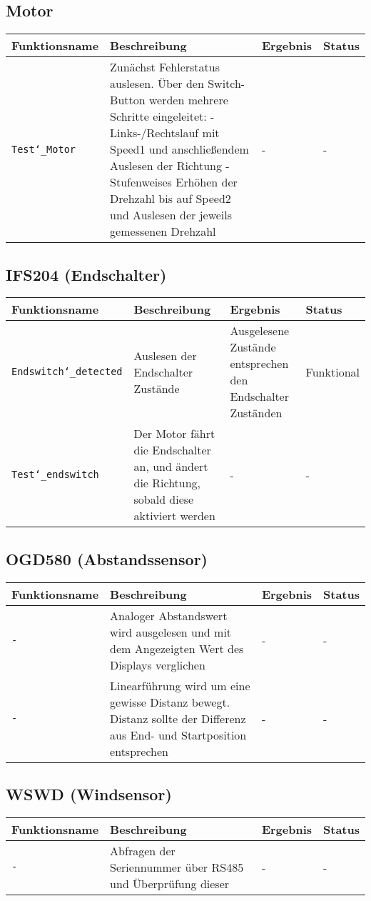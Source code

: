\documentclass{article}
\begin{document}
	\subsection{Motor}
		\begin{tabular}{|p{3.2cm}|p{5.5cm}|p{4cm}| p{1.6cm} |}
			\hline
				\textbf{Funktionsname} & \textbf{Beschreibung} & \textbf{Ergebnis} & \textbf{Status} \\
			\hline
				\texttt{Test\char`_Motor} & Zunächst Fehlerstatus auslesen. Über den Switch-Button werden mehrere Schritte eingeleitet: - Links-/Rechtslauf mit Speed1 und anschließendem Auslesen der Richtung - Stufenweises Erhöhen der Drehzahl bis auf Speed2 und Auslesen der jeweils gemessenen Drehzahl & - & - \\
			\hline
		\end{tabular}
	\subsection{IFS204 (Endschalter)}
		\begin{tabular}{|p{3.2cm}|p{5.5cm}|p{4cm}| p{1.6cm} |}
			\hline
				\textbf{Funktionsname} & \textbf{Beschreibung} & \textbf{Ergebnis} & \textbf{Status} \\
			\hline
				 \texttt{Endswitch\char`_detected} & Auslesen der Endschalter Zustände & Ausgelesene Zustände entsprechen den Endschalter Zuständen & Funktional \\
			\hline
				\texttt{Test\char`_endswitch} & Der Motor fährt die Endschalter an, und ändert die Richtung, sobald diese aktiviert werden & - & - \\
			 \hline
		\end{tabular}
	\subsection{OGD580 (Abstandssensor)}
		\begin{tabular}{|p{3.2cm}|p{5.5cm}|p{4cm}| p{1.6cm} |}
			\hline
				\textbf{Funktionsname} & \textbf{Beschreibung} & \textbf{Ergebnis} & \textbf{Status} \\
			\hline
				\texttt{-} & Analoger Abstandswert wird ausgelesen und mit dem Angezeigten Wert des Displays verglichen & - & - \\
			\hline
				\texttt{-} & Linearführung wird um eine gewisse Distanz bewegt. Distanz sollte der Differenz aus End- und Startposition entsprechen & - & - \\
			\hline
		\end{tabular}
	\subsection{WSWD (Windsensor)}
		\begin{tabular}{|p{3.2cm}|p{5.5cm}|p{4cm}| p{1.6cm} |}
			\hline
				\textbf{Funktionsname} & \textbf{Beschreibung} & \textbf{Ergebnis} & \textbf{Status} \\
			\hline
				\texttt{-} & Abfragen der Seriennummer über RS485 und Überprüfung dieser & - & - \\
			\hline
		\end{tabular}
\end{document}
